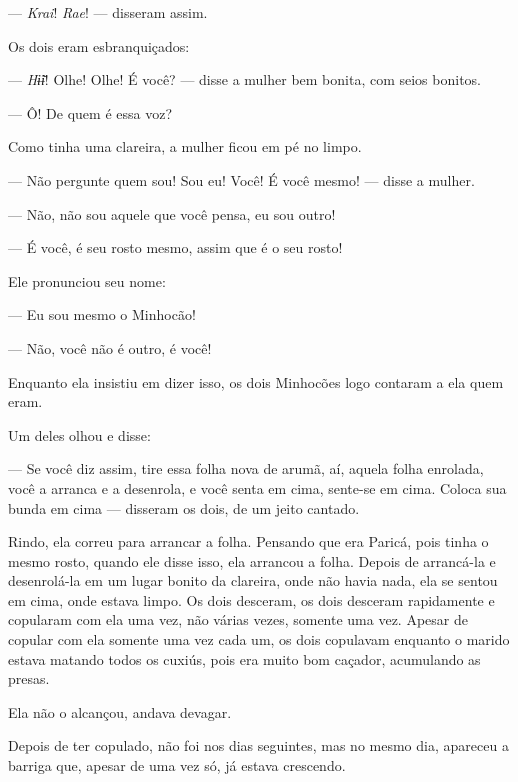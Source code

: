 
--- \textit{Krai}! \textit{Rae}! --- disseram assim. 

Os dois eram esbranquiçados: 

--- \textit{Hɨ̃ɨ}! Olhe! Olhe! É você? --- disse a mulher bem bonita, com seios
bonitos.

--- Ô! De quem é essa voz?

Como tinha uma clareira, a mulher ficou em pé no limpo. 

--- Não pergunte quem sou! Sou eu! Você! É você mesmo! --- disse a
mulher.

--- Não, não sou aquele que você pensa, eu sou outro! 

--- É você, é seu rosto mesmo, assim que é o seu rosto! 

Ele pronunciou seu nome: 

--- Eu sou mesmo o Minhocão!

--- Não, você não é outro, é você! 

Enquanto ela insistiu em dizer isso, os dois Minhocões logo contaram a ela quem eram. 

Um deles olhou e disse: 

--- Se você diz assim, tire essa folha nova de arumã, aí, aquela folha
enrolada, você a arranca e a desenrola, e você senta em cima, sente-se
em cima. Coloca sua bunda em cima --- disseram os dois, de um jeito
cantado. 

Rindo, ela correu para arrancar a folha. Pensando que era Paricá, pois
tinha o mesmo rosto, quando ele disse isso, ela arrancou a folha. Depois
de arrancá-la e desenrolá-la em um lugar bonito da clareira, onde não
havia nada, ela se sentou em cima, onde estava limpo. Os dois desceram,
os dois desceram rapidamente e copularam com ela uma vez, não várias
vezes, somente uma vez. Apesar de copular com ela somente uma vez cada um, os dois copulavam enquanto o marido estava matando todos os cuxiús,
pois era muito bom caçador, acumulando as presas. 

Ela não o alcançou, andava devagar. 

Depois de ter copulado, não foi nos dias seguintes, mas no mesmo dia,
apareceu a barriga que, apesar de uma vez só, já estava crescendo. 

